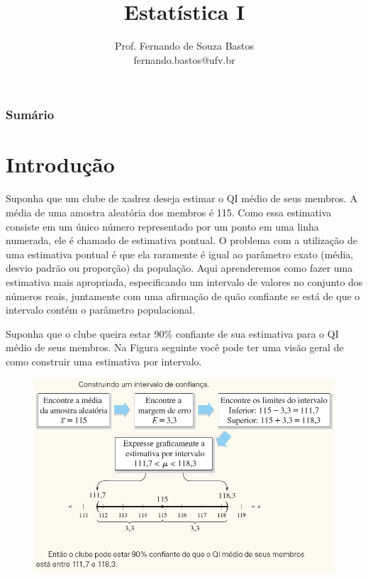 \documentclass[14pt,aspectratio=1610]{beamer}
\title{Estatística I}
\author{Prof. Fernando de Souza Bastos \texorpdfstring{\\ fernando.bastos@ufv.br}{}}
\institute{Departamento de Estatística \texorpdfstring{\\ Universidade Federal de Viçosa}{}\texorpdfstring{\\ Campus UFV - Viçosa}{}}
\date{}
\begin{document}
%

\frame{\titlepage}

\begin{frame}{}
\frametitle{\bf Sumário}
\tableofcontents
\end{frame}

\section{Introdução}
\begin{frame}{}
    \begin{block}{}
    \justifying
Suponha que um clube de xadrez deseja estimar o QI médio de seus membros. A média de uma amostra aleatória dos membros é 115. Como essa estimativa consiste em um único número representado por um ponto em uma linha numerada, ele é chamado de estimativa pontual. O problema com a utilização de uma estimativa pontual é que ela raramente é igual ao parâmetro exato (média, desvio padrão ou proporção) da população. Aqui aprenderemos como fazer uma estimativa mais apropriada, especificando um intervalo de valores no conjunto dos números reais, juntamente com uma afirmação de quão confiante se está de que o intervalo contém o parâmetro populacional.
    \end{block}
\end{frame}

\begin{frame}{}
    \begin{block}{}
    \justifying
Suponha que o clube queira estar 90\% confiante de sua estimativa para o QI médio de seus membros. Na Figura seguinte você pode ter uma visão geral de como construir uma estimativa por intervalo.
    \end{block}
\end{frame}

\begin{frame}{}
    \begin{block}{}
\begin{figure}
    \centering
    \includegraphics[scale=0.67]{figs/IC1.png}
\end{figure}
    \end{block}
\end{frame}
\end{document}
